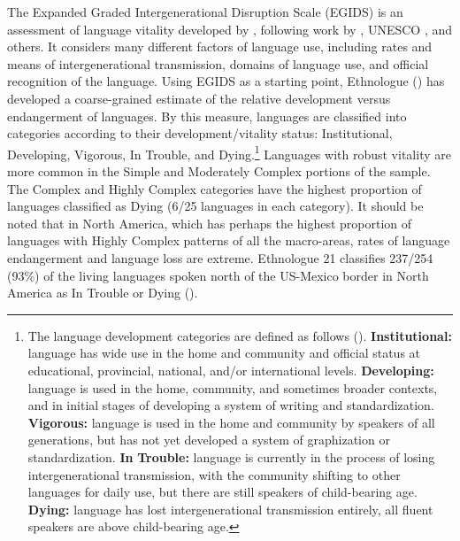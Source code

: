   The Expanded Graded Intergenerational Disruption Scale (EGIDS) is an assessment of language vitality developed by \citet{LewisSimons2010}, following work by \citet{Fishman1991}, UNESCO \citep{BrenzingerEtAl2003}, and others. It considers many different factors of language use, including rates and means of intergenerational transmission, domains of language use, and official recognition of the language. Using EGIDS as a starting point, Ethnologue (\citealt{SimonsFennig2018}) has developed a coarse-grained estimate of the relative development versus endangerment of languages. By this measure, languages are classified into categories according to their development/vitality status: Institutional, Developing, Vigorous, In Trouble, and Dying.\footnote{\textrm{The language development categories are defined as follows (\citealt{SimonsFennig2018}).} \textrm{\textbf{Institutional:} }\textrm{language has wide use in the home and community and official status at educational, provincial, national, and/or international levels.} \textrm{\textbf{Developing:} }\textrm{language is used in the home, community, and sometimes broader contexts, and in initial stages of developing a system of writing and standardization.}\textrm{ }\textrm{\textbf{Vigorous:} }\textrm{language is used in the home and community by speakers of all generations, but has not yet developed a system of graphization or standardization}\textrm{. }\textrm{\textbf{In} \textbf{Trouble:}} \textrm{language is currently in the process of losing intergenerational transmission, with the community shifting to other languages for daily use, but there are still speakers of child-bearing age.}\textrm{ }\textrm{\textbf{Dying:}} \textrm{language has lost intergenerational transmission entirely, all fluent speakers are above child-bearing age.}} Languages with robust vitality are more common in the Simple and Moderately Complex portions of the sample. The Complex and Highly Complex categories have the highest proportion of languages classified as Dying (6/25 languages in each category). It should be noted that in North America, which has perhaps the highest proportion of languages with Highly Complex patterns of all the macro-areas, rates of language endangerment and language loss are extreme. Ethnologue 21 classifies 237/254 (93\%) of the living languages spoken north of the US-Mexico border in North America as In Trouble or Dying (\citealt{SimonsFennig2018}). 




